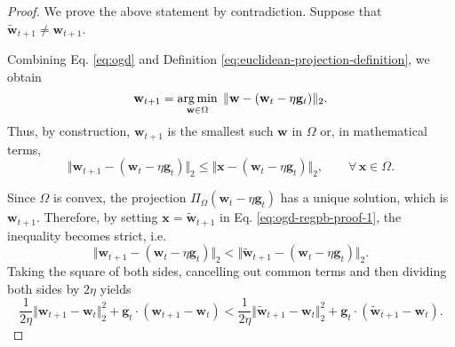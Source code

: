 \begin{proof}
We prove the above statement by contradiction.
Suppose that $\widetilde{\mathbf{w}}_{t+1} \neq \mathbf{w}_{t+1}$.%
\begin{mccorrection}
Combining Eq. \eqref{eq:ogd} and Definition \eqref{eq:euclidean-projection-definition}, we obtain
\begin{equation}
	\mathbf{w}_{t+1}
	= \operatorname*{arg\,min}_{\mathbf{w} \in \Omega} \; \Vert\mathbf{w} - (\mathbf{w}_t - \eta\mathbf{g}_t)\Vert_2.
\end{equation}
Thus, by construction, $\mathbf{w}_{t+1}$ is the smallest such $\mathbf{w}$ in $\Omega$ or, in mathematical terms,
\begin{equation}
\label{eq:ogd-regpb-proof-1}
	\Vert\mathbf{w}_{t+1} - (\mathbf{w}_t - \eta\mathbf{g}_t)\Vert_2
	\leq \Vert\mathbf{x} - (\mathbf{w}_t - \eta\mathbf{g}_t)\Vert_2,
	\qquad \forall \, \mathbf{x} \in \Omega.
\end{equation}
\end{mccorrection}
Since $\Omega$ is convex, the projection $\Pi_\Omega(\mathbf{w}_t - \eta\mathbf{g}_t)$ has a unique solution, which is $\mathbf{w}_{t+1}$. Therefore, by setting $\mathbf{x} = \widetilde{\mathbf{w}}_{t+1}$ in Eq. \eqref{eq:ogd-regpb-proof-1}, the inequality becomes strict, i.e.\
\begin{equation}
\label{eq:ogd-regpb-proof-2}
	\Vert\mathbf{w}_{t+1} - (\mathbf{w}_t - \eta\mathbf{g}_t)\Vert_2
	< \Vert\widetilde{\mathbf{w}}_{t+1} - (\mathbf{w}_t - \eta\mathbf{g}_t)\Vert_2.
\end{equation}
Taking the square of both sides, cancelling out common terms and then dividing both sides by $2\eta$ yields
\begin{equation}
\label{eq:ogd-regpb-proof-3}
	\frac{1}{2\eta}\Vert\mathbf{w}_{t+1} - \mathbf{w}_t\Vert_2^2 + \mathbf{g}_t \cdot (\mathbf{w}_{t+1} - \mathbf{w}_t)
	< \frac{1}{2\eta}\Vert\widetilde{\mathbf{w}}_{t+1} - \mathbf{w}_t\Vert_2^2 + \mathbf{g}_t \cdot (\widetilde{\mathbf{w}}_{t+1} - \mathbf{w}_t).
\end{equation}


\end{proof}
